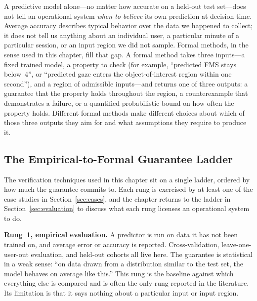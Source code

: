 \documentclass[graybox]{svmult}
\begin{document}
A predictive model alone---no matter how accurate on a held-out test set---does not tell an operational system \emph{when to believe} its own prediction at decision time. Average accuracy describes typical behavior over the data we happened to collect; it does not tell us anything about an individual user, a particular minute of a particular session, or an input region we did not sample. Formal methods, in the sense used in this chapter, fill that gap. A formal method takes three inputs---a fixed trained model, a property to check (for example, ``predicted FMS stays below~4'', or ``predicted gaze enters the object-of-interest region within one second''), and a region of admissible inputs---and returns one of three outputs: a guarantee that the property holds throughout the region, a counterexample that demonstrates a failure, or a quantified probabilistic bound on how often the property holds. Different formal methods make different choices about which of those three outputs they aim for and what assumptions they require to produce it.

\subsection{The Empirical-to-Formal Guarantee Ladder}
\label{sec:ladder}

The verification techniques used in this chapter sit on a single ladder, ordered by how much the guarantee commits to. Each rung is exercised by at least one of the case studies in Section~\ref{sec:cases}, and the chapter returns to the ladder in Section~\ref{sec:evaluation} to discuss what each rung licenses an operational system to do.

\textbf{Rung~1, empirical evaluation.} A predictor is run on data it has not been trained on, and average error or accuracy is reported. Cross-validation, leave-one-user-out evaluation, and held-out cohorts all live here. The guarantee is statistical in a weak sense: ``on data drawn from a distribution similar to the test set, the model behaves on average like this.'' This rung is the baseline against which everything else is compared and is often the only rung reported in the literature. Its limitation is that it says nothing about a particular input or input region.
\end{document}

